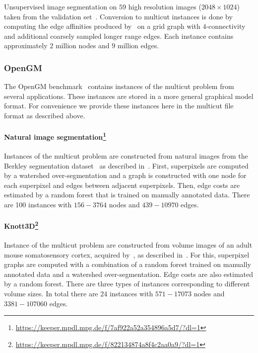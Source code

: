 Unsupervised image segmentation on $59$ high resolution images ($2048 \times 1024$) taken from the validation set~\cite{cordts2016cityscapes}.
Conversion to multicut instances is done by computing the edge affinities produced by~\cite{abbas2021combinatorial} on a grid graph with $4$-connectivity and additional coarsely sampled longer range edges.
Each instance contains approximately $2$ million nodes and $9$ million edges. 

\subsubsection{OpenGM}
The OpenGM benchmark~\cite{kappes2015comparative} contains instances of the multicut problem from several applications.
These instances are stored in a more general graphical model format. 
For convenience we provide these instances here in the multicut file format as described above.

\paragraph{Natural image segmentation\footnote{\url{https://keeper.mpdl.mpg.de/f/7af922a52a354896a5d7/?dl=1}}}
Instances of the multicut problem are constructed from natural images from the Berkley segmentation dataset~\cite{MartinFTM01} as described in~\cite{andres2011closedness}. 
First, superpixels are computed by a watershed over-segmentation and a graph is constructed with one node for each superpixel and edges between adjacent superpixels.
Then, edge costs are estimated by a random forest that is trained on manually annotated data.
There are 100 instances with $156-3764$ nodes and  $439-10970$ edges.

\paragraph*{Knott3D\footnote{\url{https://keeper.mpdl.mpg.de/f/822134874a8f4c2aa0a9/?dl=1}}}
Instance of the multicut problem are constructed from volume images of an adult mouse somatosensory cortex, acquired by~\cite{knott2008serial}, as described in~\cite{andres2012globally}.
For this, superpixel graphs are computed with a combination of a random forest trained on manually annotated data and a watershed over-segmentation.
Edge costs are also estimated by a random forest.
There are three types of instances corresponding to different volume sizes.
In total there are 24 instances with $571-17073$ nodes and $3381-107060$ edges.

